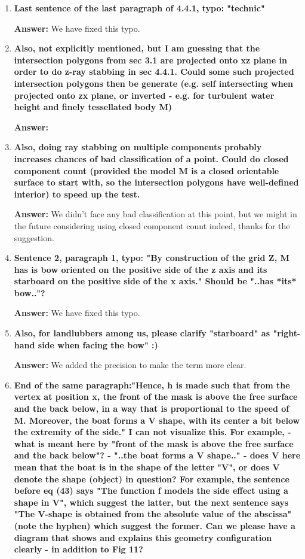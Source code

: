 \documentclass{article}
\newcommand{\answer}[1]{\textbf{\textcolor{answercolor}{Answer:}} \textcolor{answercolor}{#1}}
\begin{document}
\begin{enumerate}[label=\textbf{\arabic*.}]
    \answer{TODO what robustness issues and instability ?}

    \item \textbf{Last sentence of the last paragraph of 4.4.1, typo: "technic"}
    
    \answer{We have fixed this typo.}

    \item \textbf{Also, not explicitly mentioned, but I am guessing that the intersection polygons from sec 3.1 are projected onto xz plane in order to do z-ray stabbing in sec 4.4.1. Could some such projected intersection polygons then be generate (e.g. self intersecting when projected onto zx plane, or inverted - e.g. for turbulent water height and finely tessellated body M)}
    
    \answer{}


    \item \textbf{Also, doing ray stabbing on multiple components probably increases chances of bad classification of a point. Could do closed component count (provided the model M is a closed orientable surface to start with, so the intersection polygons have well-defined interior) to speed up the test.}
    
    \answer{We didn't face any bad classification at this point, but we might in the future considering using closed component count indeed, thanks for the suggestion.}

    \item \textbf{Sentence 2, paragraph 1, typo: "By construction of the grid Z, M has is bow oriented on the positive side of the z axis and its starboard on the positive side of the x axis." Should be "..has *its* bow.."?}
    
    \answer{We have fixed this typo.}


    \item \textbf{Also, for landlubbers among us, please clarify "starboard" as "right-hand side when facing the bow" :)}
    
    \answer{We added the precision to make the term more clear.}


    \item \textbf{End of the same paragraph:"Hence, h is made such that from the vertex at position x, the front of the mask is above the free surface and the back below, in a way that is proportional to the speed of M. Moreover, the boat forms a V shape, with its center a bit below the extremity of the side."
I can not visualize this. For example, 
- what is meant here by "front of the mask is above the free surface and the back below"?
- "..the boat forms a V shape.." - does V here mean that the boat is in the shape of the letter "V", or does V denote the shape (object) in question? For example, the sentence before eq (43) says "The function f models the side effect using a shape in V", which suggest the latter, but the next sentence says "The V-shape is obtained from the absolute value of the abscissa" (note the hyphen) which suggest the former.
Can we please have a diagram that shows and explains this geometry configuration clearly - in addition to Fig 11?}
    

\end{enumerate}
\end{document}
